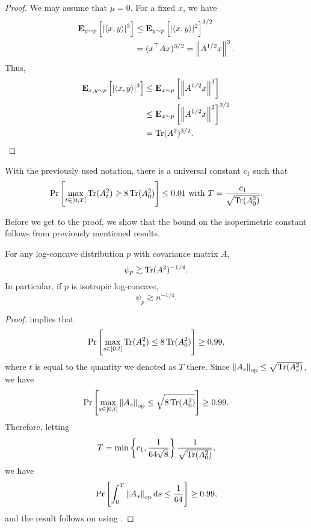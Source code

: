 \documentclass{article}
\begin{document}
		\begin{proof}
			We may assume that $\mu = 0$. For a fixed $x$, we have
			\begin{align*}
			 	\textbf{E}_{y\sim p}\left[ |\langle x,y\rangle|^3 \right] &\leq \textbf{E}_{y\sim p}\left[ |\langle x,y\rangle|^2 \right]^{3/2} \\
			 		&= (x^\top A x)^{3/2} = \left\lVert A^{1/2}x\right\rVert^3.
			 \end{align*} 
			 Thus,
			 \begin{align*}
			 	\textbf{E}_{x,y\sim p}\left[|\langle x,y\rangle|^3\right] &\leq \textbf{E}_{x \sim p} \left[ \left\lVert A^{1/2} x\right\rVert^3 \right] \\
			 		&\leq \textbf{E}_{x\sim p} \left[ \left\lVert A^{1/2}x\right\rVert^2 \right]^{3/2} \\
			 		&= \operatorname{Tr}(A^2)^{3/2}.
			 \end{align*}
		\end{proof}

		\begin{theorem}
			\label{lee-vem: growth theorem}
			With the previously used notation, there is a universal constant $c_1$ such that
			\[ \Pr\left[\max_{t \in [0,T]} \operatorname{Tr}(A_t^2) \geq 8 \operatorname{Tr}(A_0^2) \right] \leq 0.01 \text{ with } T = \frac{c_1}{\sqrt{\operatorname{Tr}(A_0^2)}}. \]
		\end{theorem}

		Before we get to the proof, we show that the bound on the isoperimetric constant follows from previously mentioned results.

		\begin{corollary}
			For any log-concave distribution $p$ with covariance matrix $A$,
			\[ \psi_p \gtrsim \operatorname{Tr}(A^2)^{-1/4}. \]
			In particular, if $p$ is isotropic log-concave,
			\[ \psi_p \gtrsim n^{-1/4}. \]
		\end{corollary}
		\begin{proof}
			 implies that
			\[ \Pr\left[\max_{s \in [0,t]} \operatorname{Tr}(A_s^2) \leq 8 \operatorname{Tr}(A_0^2)\right] \geq 0.99, \]
			where $t$ is equal to the quantity we denoted as $T$ there. Since $\left\lVert A_s\right\rVert_{\text{op}} \leq \sqrt{\operatorname{Tr}(A_s^2)}$, we have
			\[ \Pr\left[\max_{s \in [0,t]} \left\lVert A_s\right\rVert_{\text{op}} \leq \sqrt{8 \operatorname{Tr}(A_0^2)}\right] \geq 0.99. \]
			Therefore, letting
			\[ T = \min\left\{c_1, \frac{1}{64\sqrt{8}}\right\} \frac{1}{\sqrt{\operatorname{Tr}(A_0^2)}}, \]
			we have
			\[ \Pr\left[\int_0^T \left\lVert A_s\right\rVert_{\text{op}}\operatorname{d}\!{s} \leq \frac{1}{64}\right] \geq 0.99, \]
			and the result follows on using .
		\end{proof}
\end{document}
